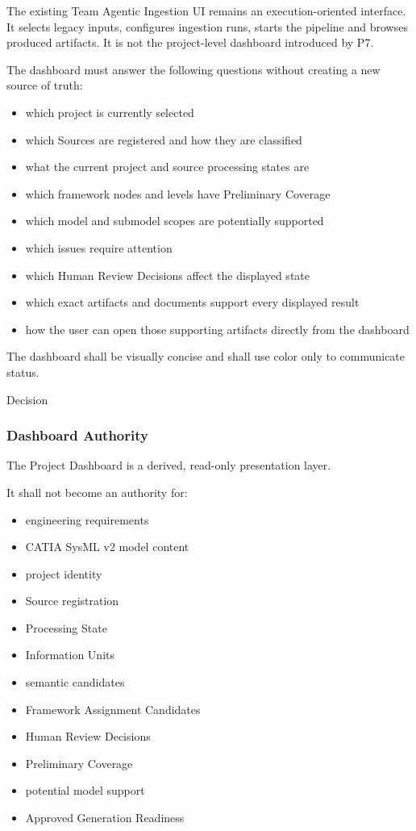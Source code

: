 The existing Team Agentic Ingestion UI remains an execution-oriented interface. It selects legacy inputs, configures ingestion runs, starts the pipeline and browses produced artifacts. It is not the project-level dashboard introduced by P7.

The dashboard must answer the following questions without creating a new source of truth:

\begin{itemize}
\tightlist
\item
  which project is currently selected
\item
  which Sources are registered and how they are classified
\item
  what the current project and source processing states are
\item
  which framework nodes and levels have Preliminary Coverage
\item
  which model and submodel scopes are potentially supported
\item
  which issues require attention
\item
  which Human Review Decisions affect the displayed state
\item
  which exact artifacts and documents support every displayed result
\item
  how the user can open those supporting artifacts directly from the dashboard
\end{itemize}

The dashboard shall be visually concise and shall use color only to communicate status.

Decision

\hypertarget{dashboard-authority}{%
\subsubsection{Dashboard Authority}\label{dashboard-authority}}

The Project Dashboard is a derived, read-only presentation layer.

It shall not become an authority for:

\begin{itemize}
\tightlist
\item
  engineering requirements
\item
  CATIA SysML v2 model content
\item
  project identity
\item
  Source registration
\item
  Processing State
\item
  Information Units
\item
  semantic candidates
\item
  Framework Assignment Candidates
\item
  Human Review Decisions
\item
  Preliminary Coverage
\item
  potential model support
\item
  Approved Generation Readiness
\end{itemize}

